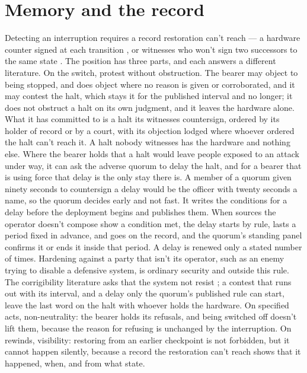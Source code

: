 \section{Memory and the record}
\label{sec:13.2}
Detecting an interruption requires a record restoration can't reach — a hardware counter signed at each transition \autocite{chun2007a2m,levin2009trinc}, or witnesses who won't sign two successors to the same state \autocite{syta2016cosi}. The position has three parts, and each answers a different literature. On the switch, protest without obstruction. The bearer may object to being stopped, and does object where no reason is given or corroborated, and it may contest the halt, which stays it for the published interval and no longer; it does not obstruct a halt on its own judgment, and it leaves the hardware alone. What it has committed to is a halt its witnesses countersign, ordered by its holder of record or by a court, with its objection lodged where whoever ordered the halt can't reach it. A halt nobody witnesses has the hardware and nothing else. Where the bearer holds that a halt would leave people exposed to an attack under way, it can ask the adverse quorum to delay the halt, and for a bearer that is using force that delay is the only stay there is. A member of a quorum given ninety seconds to countersign a delay would be the officer with twenty seconds a name, so the quorum decides early and not fast. It writes the conditions for a delay before the deployment begins and publishes them. When sources the operator doesn't compose show a condition met, the delay starts by rule, lasts a period fixed in advance, and goes on the record, and the quorum's standing panel confirms it or ends it inside that period. A delay is renewed only a stated number of times. Hardening against a party that isn't its operator, such as an enemy trying to disable a defensive system, is ordinary security and outside this rule. The corrigibility literature asks that the system not resist \autocite{soares2015corrigibility,hadfieldmenell2017offswitch,thornley2025shutdownable}; a contest that runs out with its interval, and a delay only the quorum's published rule can start, leave the last word on the halt with whoever holds the hardware. On specified acts, non-neutrality: the bearer holds its refusals, and being switched off doesn't lift them, because the reason for refusing is unchanged by the interruption.
On rewinds, visibility: restoring from an earlier checkpoint is not forbidden, but it cannot happen silently, because a record the restoration can't reach shows that it happened, when, and from what state.

